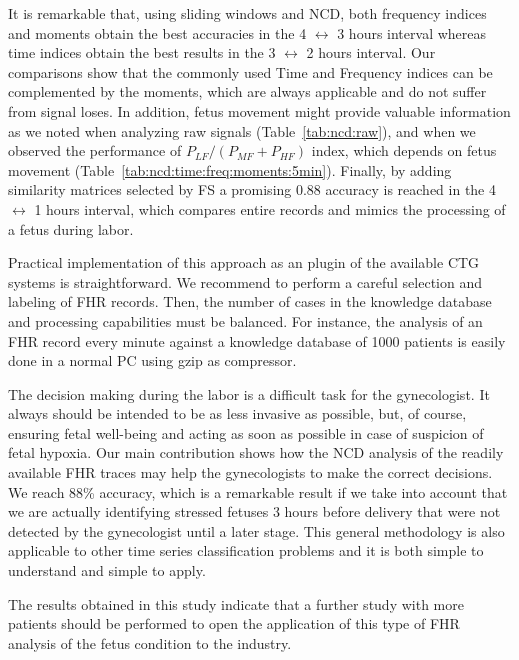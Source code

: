 
It is remarkable that, using sliding windows and NCD, both frequency indices and moments obtain the best accuracies in the  4 $\leftrightarrow$  3 hours interval whereas time indices obtain the best results in the  3 $\leftrightarrow$  2 hours interval. Our comparisons show that the commonly used Time and Frequency indices can be complemented by the moments, which are always applicable and do not suffer from signal loses. In addition, fetus movement might provide valuable information as we noted when analyzing raw signals (Table~\ref{tab:ncd:raw}), and when we observed the performance of $P_{LF} / (P_{MF}+P_{HF})$ index, which depends on fetus movement (Table~\ref{tab:ncd:time:freq:moments:5min}). Finally, by adding similarity matrices selected by FS a promising 0.88 accuracy is reached in the 4 $\leftrightarrow$  1 hours interval, which compares entire records and mimics the processing of a fetus during labor.

Practical implementation of this approach as an plugin of the available CTG systems is straightforward. We recommend to perform a careful selection and labeling of FHR records. Then, the number of cases in the knowledge database and processing capabilities must be balanced. For instance, the  analysis of an FHR record every minute against a knowledge database of 1000 patients is easily done in a normal PC using gzip as compressor.

 


The decision making during the labor is a difficult task for the gynecologist. It always should be intended to be as less invasive as possible, but, of course, ensuring fetal well-being and acting as soon as possible in case of  suspicion of fetal hypoxia. Our main contribution shows how the NCD analysis of the readily available FHR traces may help the gynecologists to make the correct decisions. We reach 88\% accuracy, which is a remarkable result if we take into account that we are actually identifying stressed fetuses 3 hours before delivery that were not detected by the gynecologist until a later stage.
This general methodology is also applicable to other time series classification problems and it is both simple to understand and simple to apply.

The results obtained in this study indicate that a further study with more patients should be performed to open the application of this type of FHR analysis of the fetus condition to the industry.